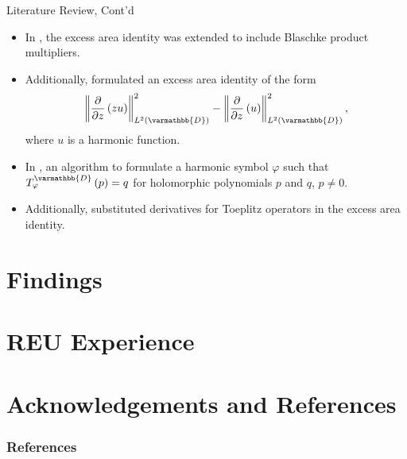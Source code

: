 \documentclass{beamer}
\newcommand{\norm}[1]{\left\Vert #1 \right\Vert}
\renewcommand*{\mathbb}[1]{\varmathbb{#1}}
\begin{document}
\begin{frame}{Literature Review, Cont'd}
  \begin{itemize}
    \item In \cite{bambico2022generalization}, the excess area identity was extended to include Blaschke product multipliers.
    \item Additionally, \cite{bambico2022generalization} formulated an excess area identity of the form
      \begin{align*}
        \norm{\frac{\partial}{\partial z}\left(zu\right)}_{L^{2}\left(\mathbb{D}\right)}^2 - \norm{\frac{\partial}{\partial z}\left(u\right)}_{L^{2}\left(\mathbb{D}\right)}^2,
      \end{align*}
      where $u$ is a harmonic function.
  \end{itemize}
  \begin{itemize}
    \item In \cite{AshleyAdenCelikDanielLuke2024}, an algorithm to formulate a harmonic symbol $\varphi$ such that $T^{\mathbb{D}}_{\varphi}\left(p\right) = q$ for holomorphic polynomials $p$ and $q$, $p\neq 0$.
    \item Additionally, \cite{AshleyAdenCelikDanielLuke2024} substituted derivatives for Toeplitz operators in the excess area identity.
  \end{itemize}
\end{frame}
\section{Findings}
\section{REU Experience}
\section{Acknowledgements and References}
\begin{frame}[allowframebreaks]
  \frametitle{References}
  
  
\end{frame}
\end{document}
